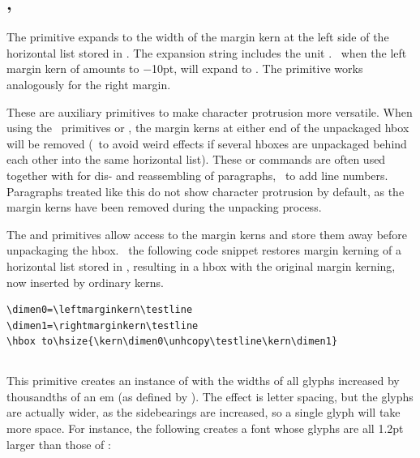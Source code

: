 \documentclass{pdftexmanual}
\begin{document}
\subsection{, }

The   primitive expands to the
width of the margin kern at the left side of the horizontal list stored
in  . The expansion string includes the
unit . \Eg\ when the left margin kern of  amounts to
$-$10pt,  will expand to \type{-10pt}. The primitive
 works analogously for the right margin.

These are auxiliary primitives to make character protrusion more
versatile. When using the \TEX\ primitives  or ,
the margin kerns at either end of the unpackaged hbox will be removed
(\eg\ to avoid weird effects if several hboxes are unpackaged behind
each other into the same horizontal list). These  or
 commands are often used together with  for dis-
and re\hyph assembling of paragraphs, \eg\ to add line numbers.
Paragraphs treated like this do not show character protrusion by
default, as the margin kerns have been removed during the unpacking
process.

The  and  primitives allow
access to the margin kerns and store them away before unpackaging the
hbox. \Eg\ the following code snippet restores margin kerning of
a horizontal list stored in , resulting in a hbox with
the original margin kerning, now inserted by ordinary kerns.

\begin{verbatim}
\dimen0=\leftmarginkern\testline
\dimen1=\rightmarginkern\testline
\hbox to\hsize{\kern\dimen0\unhcopy\testline\kern\dimen1}
\end{verbatim}

\subsection{}

This primitive creates an instance of  with the widths
of all glyphs increased by  thousandths of an em (as
defined by ). The effect is letter spacing, but the
glyphs are actually wider, as the sidebearings are increased, so a
single glyph will take more space. For instance, the following creates a
font  whose glyphs are all 1.2pt larger than those of
:
\end{document}
